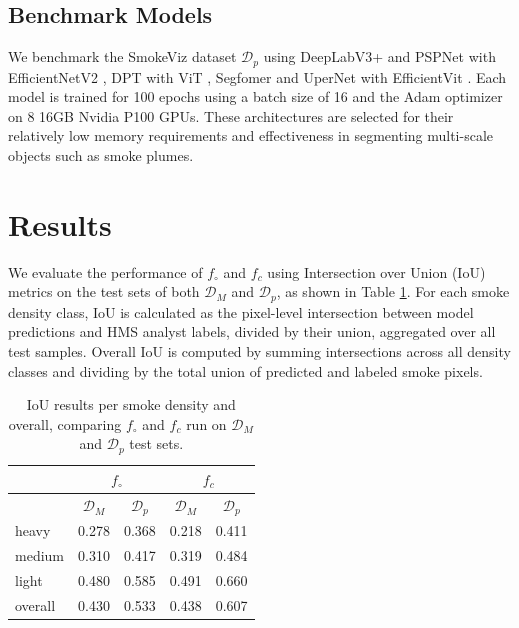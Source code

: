 \documentclass{article}
\begin{document}
\subsection{Benchmark Models}

We benchmark the SmokeViz dataset \(\mathcal{D}_{p}\) using DeepLabV3+ \cite{deeplab} and PSPNet \cite{pspnet} with EfficientNetV2 \cite{efficientnetv2}, DPT \cite{dpt} with ViT \cite{vit}, Segfomer \cite{segformer} and UperNet \cite{upernet} with EfficientVit \cite{efficientvit}. Each model is trained for 100 epochs using a batch size of 16 and the Adam optimizer on 8 16GB Nvidia P100 GPUs. These architectures are selected for their relatively low memory requirements and effectiveness in segmenting multi-scale objects such as smoke plumes.

\section{Results}

We evaluate the performance of \(f_{\circ}\) and \(f_c\) using Intersection over Union (IoU) metrics on the test sets of both \(\mathcal{D}_M\) and \(\mathcal{D}_p\), as shown in Table \ref{iou_results}. For each smoke density class, IoU is calculated as the pixel-level intersection between model predictions and HMS analyst labels, divided by their union, aggregated over all test samples. Overall IoU is computed by summing intersections across all density classes and dividing by the total union of predicted and labeled smoke pixels.

\begin{table}[!htb]
    \caption{IoU results per smoke density and overall, comparing \(f_{\circ}\) and \(f_c\) run on \(\mathcal{D}_M\) and \(\mathcal{D}_p\) test sets.}
    \label{iou_results}
    \centering
    \begin{tabular}{lcc|cc}
        \toprule
        \multicolumn{1}{c}{} & \multicolumn{2}{c}{\(f_{\circ}\)} & \multicolumn{2}{c}{\(f_c\)}\\
        \midrule
        \multicolumn{1}{c}{} & \(\mathcal{D}_M\) & \(\mathcal{D}_{p}\) & \(\mathcal{D}_M\) & \(\mathcal{D}_{p}\) \\
        \midrule
        heavy   & 0.278 & 0.368 & 0.218 &  0.411 \\
        medium  & 0.310 & 0.417 & 0.319 &  0.484 \\
        light   & 0.480 & 0.585 & 0.491 &  0.660 \\
        overall & 0.430 & 0.533 & 0.438 &  0.607 \\
        \bottomrule
    \end{tabular}
\end{table}
\end{document}
